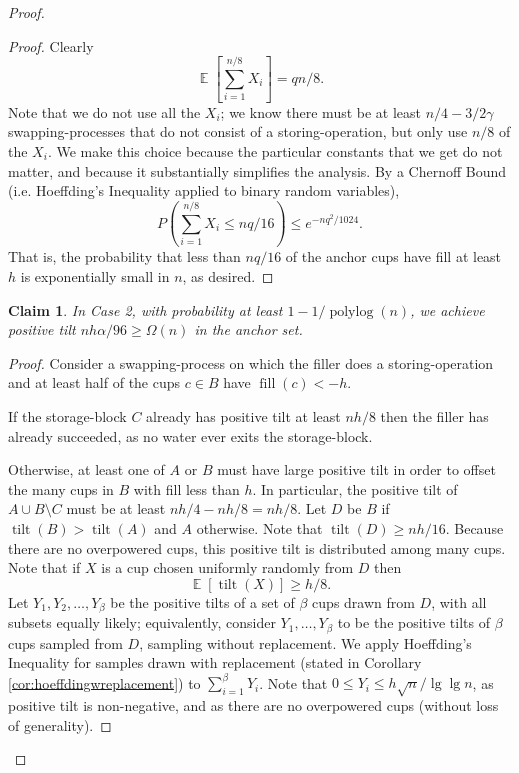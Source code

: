 \documentclass[twocolumn]{article}[10pt]
\DeclareMathOperator{\E}{\mathbb{E}}
\DeclareMathOperator{\polylog}{\text{polylog}}
\DeclareMathOperator{\tilt}{\text{tilt}}
\DeclareMathOperator{\fil}{\text{fill}}
\newtheorem{clm}{Claim}
\begin{document}
\begin{proof}
{\begin{proof}
  Clearly $$\E\left[\sum_{i=1}^{n/8} X_i\right] = qn/8.$$ Note that we do not
  use all the $X_i$; we know there must be at least $n/4 - 3/2 \gamma$
  swapping-processes that do not consist of a storing-operation, but only use
  $n/8$ of the $X_i$. We make this choice because the particular constants that
  we get do not matter, and because it substantially simplifies the analysis.
  By a Chernoff Bound (i.e. Hoeffding's Inequality applied to binary random variables),
  $$P\left(\sum_{i=1}^{n/8} X_i\le nq/16\right) \le e^{-nq^2/1024}.$$ That is, the
  probability that less than $nq/16$ of the anchor cups have fill at least $h$ is
  exponentially small in $n$, as desired.

\end{proof}

\begin{clm}
  \label{clm:xtreme}
  In Case 2, with probability at least $1- 1/\polylog(n)$, we achieve positive
  tilt $n h\alpha/96 \ge \Omega(n)$ in the anchor set.
\end{clm}

\begin{proof}
  Consider a swapping-process on which the filler does a storing-operation and
  at least half of the cups $c \in B$ have $\fil(c) < -h$.

  If the storage-block $C$ already has positive tilt at least $nh/8$ then the
  filler has already succeeded, as no water ever exits the storage-block.

  Otherwise, at least one of $A$ or $B$ must have large positive tilt in order
  to offset the many cups in $B$ with fill less than $h$. In particular, the
  positive tilt of $A \cup B \setminus C$ must be at least $nh/4 - nh/8 =
  nh/8$. Let $D$ be $B$ if $\tilt(B) > \tilt(A)$ and $A$ otherwise. Note that
  $\tilt(D) \ge nh/16$. Because there are no overpowered cups, this positive
  tilt is distributed among many cups. Note that if $X$ is a cup chosen
  uniformly randomly from $D$ then $$\E[\tilt(X)] \ge h/8.$$ Let
  $Y_1,Y_2,\ldots, Y_\beta$ be the positive tilts of a set of $\beta$ cups
  drawn from $D$, with all subsets equally likely; equivalently, consider
  $Y_1,\ldots, Y_\beta$ to be the positive tilts of $\beta$ cups sampled from
  $D$, sampling without replacement. 
  We apply Hoeffding's Inequality for samples drawn with replacement (stated in
  Corollary \ref{cor:hoeffdingwreplacement}) to $\sum_{i=1}^\beta Y_i$. Note
  that $0\le Y_i \le h\sqrt{n}/\lg\lg n$, as positive tilt is
  non-negative, and as there are no overpowered cups (without loss of
  generality). 
  

\end{proof}}
\end{proof}
\end{document}
